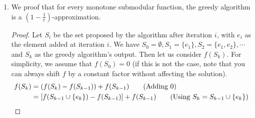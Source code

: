 \documentclass[12pt]{exam}
\newtheorem{lemma}[theorem]{Lemma}
\begin{document}
\begin{questions}
\begin{solution}
\begin{enumerate}[label=(\alph*)]
\begin{lemma}
        \[
          f(S \cup \{i\}) - f(S) \geq \frac{1}{k}(OPT - f(S))
        \]
      \end{lemma}
      \begin{proof}
        Following the hint, suppose that at the $i$-th iteration, our algorithm was allowed to pick $k$ elements. Certainly then, we would be able to increase our objectve by exactly $OPT - f(S)$ - we could simply pick the $k$ elements in the optimal set, $S_{OPT}$. As such, we know that:
        \[
          f(S \cup S_{OPT}) - f(S) = OPT - f(S)
        \]
        Define $S_{OPT}^m = \{x_1, \cdots, x_m\}$ where $S_{OPT}^k = S_{OPT}$ be the set of elements we added. Then since we only add $k$ elements but increase in total by $OPT - f(S)$, we must have that at some point adding the $m$-th element led to a sufficiently large increase. That is, we must have there exists $m$ such that:
        \[
          f(S \cup S_{OPT}^{m-1} \cup \{x_m\}) - f(S \cup S_{OPT}^{m-1}) \geq \frac{1}{k}(OPT - f(S))
        \]
        Then we have the following logic:
      \begin{align*}
        f(S \cup \{i\}) - f(S) &\geq f(S \cup \{x_m\}) - f(S) \tag{$i$ leads to maximal marginal increase} \\
        &\geq f(S \cup S^{m-1}_{OPT} \cup \{x_m\}) - f(S \cup S^{m-1}_{OPT}) \tag{By Submodularity of $f$ using $T = S \cup S^{m-1}_{OPT}$} \\
        &\geq \frac{1}{k}(OPT - f(S)) \tag{By argument above}
      \end{align*}
      This concludes our proof.
      \end{proof}
    \item
      We proof that for every monotone submodular function, the greedy algorithm is a $(1 - \frac{1}{e})$-approximation.
      \begin{proof}
        Let $S_i$ be the set proposed by the algorithm after iteration $i$, with $e_i$ as the element added at iteration $i$. We have $S_0 = \emptyset, S_1 = \{e_1\}, S_2 = \{e_1, e_2\}, \cdots$ and $S_k$ as the greedy algorithm's output. Then let us consider $f(S_k)$. For simplicity, we assume that $f(S_0) = 0$ (if this is not the case, note that you can always shift $f$ by a constant factor without affecting the solution).
        \begin{align*}
          f(S_k) &= (f(S_k) - f(S_{k-1})) + f(S_{k-1}) \tag{Adding $0$} \\
          &= [f(S_{k-1} \cup \{e_k\}) - f(S_{k-1})] + f(S_{k-1}) \tag{Using $S_k = S_{k-1} \cup \{e_k\}$} \\

\end{align*}
\end{proof}
\end{enumerate}
\end{solution}
\end{questions}
\end{document}
